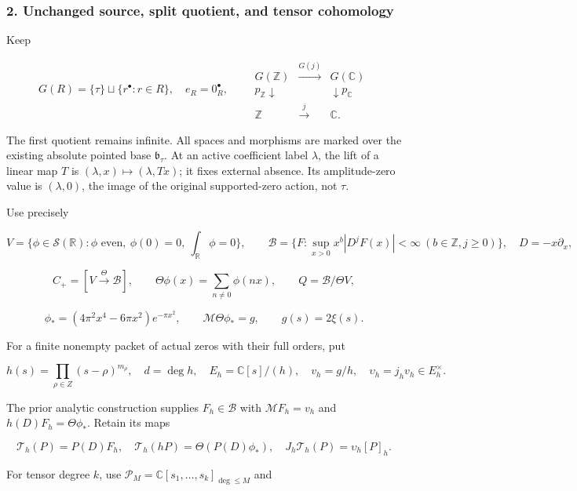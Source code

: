 \subsubsection{2. Unchanged source, split quotient, and tensor
cohomology}\label{spectral_sum_full:unchanged-source-split-quotient-and-tensor-cohomology}

Keep

\[G(R)=\{\tau\}\sqcup\{r^\bullet:r\in R\},\quad e_R=0_R^\bullet,\qquad
\begin{array}{ccc}G(\mathbb Z)&\xrightarrow{G(j)}&G(\mathbb C)\\
p_{\mathbb Z}\downarrow&&\downarrow p_{\mathbb C}\\
\mathbb Z&\xrightarrow{j}&\mathbb C.\end{array}\tag{2.1}\]

The first quotient remains infinite. All spaces and morphisms are marked
over the existing absolute pointed base \(\mathfrak b_\tau\). At an
active coefficient label \(\lambda\), the lift of a linear map \(T\) is
\((\lambda,x)\mapsto(\lambda,Tx)\); it fixes external absence. Its
amplitude-zero value is \((\lambda,0)\), the image of the original
supported-zero action, not \(\tau\).

Use precisely

\begingroup\footnotesize
\[V=\{\phi\in\mathcal S(\mathbb R):\phi\text{ even},\ \phi(0)=0,\ \int_{\mathbb R}\phi=0\},\qquad
\mathscr B=\{F:\sup_{x>0}x^b|D^jF(x)|<\infty\ (b\in\mathbb Z,j\ge0)\},\quad D=-x\partial_x,\]
\endgroup

\[C_+=[V\xrightarrow\Theta\mathscr B],\qquad
\Theta\phi(x)=\sum_{n\ne0}\phi(nx),\qquad Q=\mathscr B/\Theta V,\]

\[\phi_*=(4\pi^2x^4-6\pi x^2)e^{-\pi x^2},\qquad
\mathcal M\Theta\phi_*=g,\qquad g(s)=2\xi(s).\tag{2.2}\]

For a finite nonempty packet of actual zeros with their full orders, put

\[h(s)=\prod_{\rho\in Z}(s-\rho)^{m_\rho},\quad d=\deg h,\quad
E_h=\mathbb C[s]/(h),\quad v_h=g/h,\quad \upsilon_h=j_hv_h\in E_h^\times.\]

The prior analytic construction supplies \(F_h\in\mathscr B\) with
\(\mathcal MF_h=v_h\) and \(h(D)F_h=\Theta\phi_*\). Retain its maps

\[\mathcal T_h(P)=P(D)F_h,\quad
\mathcal T_h(hP)=\Theta(P(D)\phi_*),\quad J_h\mathcal T_h(P)=\upsilon_h[P]_h.\tag{2.3}\]

For tensor degree \(k\), use
\(\mathcal P_M=\mathbb C[s_1,\ldots,s_k]_{\deg\le M}\) and

